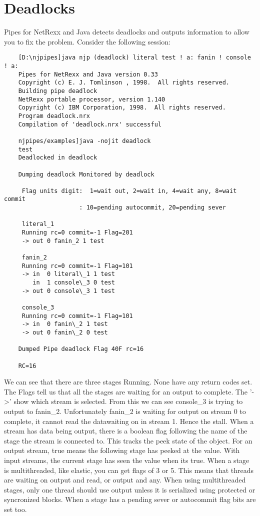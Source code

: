 \chapter{Deadlocks}
Pipes for NetRexx and Java detects deadlocks and outputs information to allow you to fix the problem.  Consider the following session:
\begin{verbatim}
    [D:\njpipes]java njp (deadlock) literal test ! a: fanin ! console ! a:
    Pipes for NetRexx and Java version 0.33
    Copyright (c) E. J. Tomlinson , 1998.  All rights reserved.
    Building pipe deadlock
    NetRexx portable processor, version 1.140
    Copyright (c) IBM Corporation, 1998.  All rights reserved.
    Program deadlock.nrx
    Compilation of 'deadlock.nrx' successful

    njpipes/examples]java -nojit deadlock
    test
    Deadlocked in deadlock

    Dumping deadlock Monitored by deadlock

     Flag units digit:  1=wait out, 2=wait in, 4=wait any, 8=wait commit
                     : 10=pending autocommit, 20=pending sever

     literal_1
     Running rc=0 commit=-1 Flag=201
     -> out 0 fanin_2 1 test

     fanin_2
     Running rc=0 commit=-1 Flag=101
     -> in  0 literal\_1 1 test
        in  1 console\_3 0 test
     -> out 0 console\_3 1 test

     console_3
     Running rc=0 commit=-1 Flag=101
     -> in  0 fanin\_2 1 test
     -> out 0 fanin\_2 0 test

    Dumped Pipe deadlock Flag 40F rc=16

    RC=16
\end{verbatim}

We can see that there are three stages Running.  None have any return codes set.  The Flags tell us that all the stages are waiting for an output to complete.  The '->' show which stream is selected.  From this we can see console\_3 is trying to output to fanin\_2. Unfortunately fanin\_2 is waiting for output on stream 0 to complete, it cannot read the datawaiting on in stream 1.  Hence the stall.
When a stream has data being output, there is a boolean flag following the name of the stage the stream is connected to. This tracks the peek state of the object.  For an output stream, true means the following stage has peeked at the value. With input streams, the current stage has seen the value when its true.
When a stage is multithreaded, like elastic, you can get flags of 3 or 5. This means that threads are waiting on output and read, or output and any. When using multithreaded stages, only one thread should use output unless it is serialized using protected or syncronized blocks.
When a stage has a pending sever or autocommit flag bits are set too.

